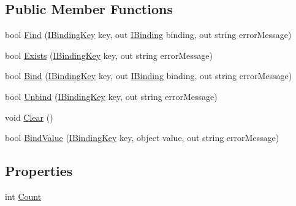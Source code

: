 \subsection*{Public Member Functions}
\begin{DoxyCompactItemize}
\item 
bool \mbox{\hyperlink{interfacecp_games_1_1core_1_1_rapid_m_v_c_1_1_i_binding_collection_a7c6b93ad95ca21419be73882d1156458}{Find}} (\mbox{\hyperlink{interfacecp_games_1_1core_1_1_rapid_m_v_c_1_1_i_binding_key}{I\+Binding\+Key}} key, out \mbox{\hyperlink{interfacecp_games_1_1core_1_1_rapid_m_v_c_1_1_i_binding}{I\+Binding}} binding, out string error\+Message)
\item 
bool \mbox{\hyperlink{interfacecp_games_1_1core_1_1_rapid_m_v_c_1_1_i_binding_collection_affd71123e4a9ce2af8013c57b216332c}{Exists}} (\mbox{\hyperlink{interfacecp_games_1_1core_1_1_rapid_m_v_c_1_1_i_binding_key}{I\+Binding\+Key}} key, out string error\+Message)
\item 
bool \mbox{\hyperlink{interfacecp_games_1_1core_1_1_rapid_m_v_c_1_1_i_binding_collection_afff4c2ad2ff9fb25c906864bc28f036f}{Bind}} (\mbox{\hyperlink{interfacecp_games_1_1core_1_1_rapid_m_v_c_1_1_i_binding_key}{I\+Binding\+Key}} key, out \mbox{\hyperlink{interfacecp_games_1_1core_1_1_rapid_m_v_c_1_1_i_binding}{I\+Binding}} binding, out string error\+Message)
\item 
bool \mbox{\hyperlink{interfacecp_games_1_1core_1_1_rapid_m_v_c_1_1_i_binding_collection_ab20c12c64a91e24e7685780dd64f1d87}{Unbind}} (\mbox{\hyperlink{interfacecp_games_1_1core_1_1_rapid_m_v_c_1_1_i_binding_key}{I\+Binding\+Key}} key, out string error\+Message)
\item 
void \mbox{\hyperlink{interfacecp_games_1_1core_1_1_rapid_m_v_c_1_1_i_binding_collection_ac77dd990cf638c604bb90646e2fed55d}{Clear}} ()
\item 
bool \mbox{\hyperlink{interfacecp_games_1_1core_1_1_rapid_m_v_c_1_1_i_binding_collection_a2a468c5570b780133763d9592e2c1cb5}{Bind\+Value}} (\mbox{\hyperlink{interfacecp_games_1_1core_1_1_rapid_m_v_c_1_1_i_binding_key}{I\+Binding\+Key}} key, object value, out string error\+Message)
\end{DoxyCompactItemize}
\subsection*{Properties}
\begin{DoxyCompactItemize}
\item 
int \mbox{\hyperlink{interfacecp_games_1_1core_1_1_rapid_m_v_c_1_1_i_binding_collection_a9365956363826896a1a7caaeb494d0a1}{Count}}
\end{DoxyCompactItemize}


